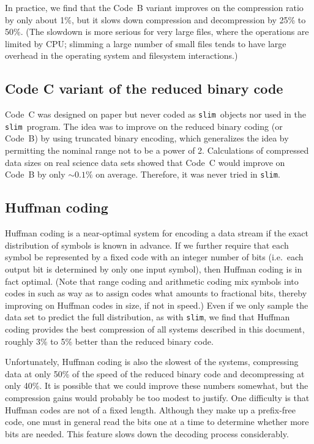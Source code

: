 \documentclass[11pt]{article}
\newcommand{\slim}{{\tt slim}}
\begin{document}
In practice, we find that the Code~B variant improves on the
compression ratio by only about 1\%, but it slows down compression and
decompression by 25\% to 50\%.  (The slowdown is more serious for very
large files, where the operations are limited by CPU; slimming a large
number of small files tends to have large overhead in the operating
system and filesystem interactions.)


\subsection{Code C variant of the reduced binary code}

Code~C was designed on paper but never coded as \slim\ objects nor
used in the \slim\ program.  The idea was to improve on the reduced
binary coding (or Code~B) by using truncated binary encoding, which
generalizes the idea by permitting the nominal range not to be a power
of 2.  Calculations of compressed data sizes on real science data sets
showed that Code~C would improve on Code~B by only $\sim0.1\%$ on
average.  Therefore, it was never tried in \slim.


\subsection{Huffman coding}

Huffman coding is a near-optimal system for encoding a data stream if
the exact distribution of symbols is known in advance.  If we further
require that each symbol be represented by a fixed code with an
integer number of bits (i.e.\ each output bit is determined by only
one input symbol), then Huffman coding is in fact optimal.  (Note that
range coding and arithmetic coding mix symbols into codes in such as
way as to assign codes what amounts to fractional bits, thereby
improving on Huffman codes in size, if not in speed.)  Even if we only
sample the data set to predict the full distribution, as with \slim,
we find that Huffman coding provides the best compression of all
systems described in this document, roughly 3\% to 5\% better than the
reduced binary code.

Unfortunately, Huffman coding is also the slowest of the systems,
compressing data at only 50\% of the speed of the reduced binary code
and decompressing at only 40\%.  It is possible that we could improve
these numbers somewhat, but the compression gains would probably be
too modest to justify.  One difficulty is that Huffman codes are not
of a fixed length.  Although they make up a prefix-free code, one must
in general read the bits one at a time to determine whether more bits
are needed. This feature slows down the decoding process considerably.
\end{document}

